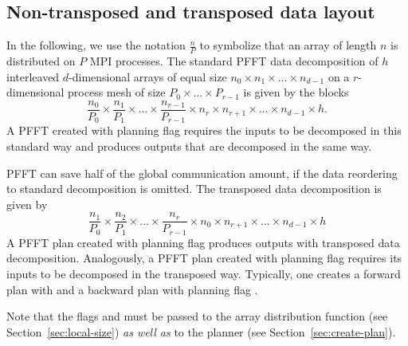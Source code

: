 \subsection{Non-transposed and transposed data layout}
In the following, we use the notation $\frac{n}{P}$ to symbolize that an array of length $n$ is distributed on $P$ MPI processes.
The standard PFFT data decomposition of $h$ interleaved $d$-dimensional arrays of equal size $n_0 \times n_1\times \hdots \times n_{d-1}$
on a $r$-dimensional process mesh of size $P_0\times \hdots \times P_{r-1}$ is given by the blocks
\begin{equation*}
  \frac{n_0}{P_0} \times \frac{n_1}{P_1} \times \hdots \times \frac{n_{r-1}}{P_{r-1}}  \times n_r \times n_{r+1} \times \hdots \times n_{d-1} \times h.
\end{equation*}
A PFFT created with planning flag  requires the inputs to be decomposed in this standard way and produces
outputs that are decomposed in the same way.

PFFT can save half of the global communication amount, if the data reordering to standard decomposition is omitted. 
The transposed data decomposition is given by
\begin{equation*}
  \frac{n_1}{P_0} \times \frac{n_2}{P_1} \times \hdots \times \frac{n_{r}}{P_{r-1}}  \times n_0 \times n_{r+1} \times \hdots \times n_{d-1} \times h
\end{equation*}
A PFFT plan created with planning flag  produces outputs with transposed data decomposition.
Analogously, a PFFT plan created with planning flag  requires its inputs to be decomposed in the transposed way.
Typically, one creates a forward plan with  and a backward plan with planning flag .

Note that the flags  and  must be passed to the array distribution function (see Section~\ref{sec:local-size})
\emph{as well as} to the planner (see Section~\ref{sec:create-plan}).


